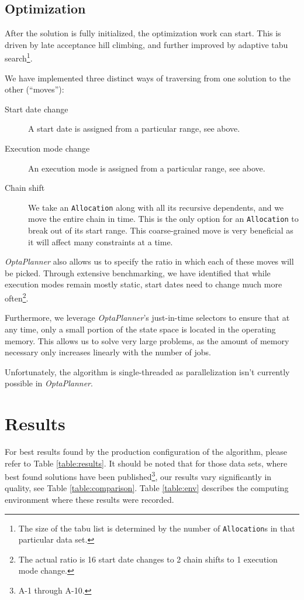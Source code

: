 \documentclass[10pt,a4paper]{article}
\begin{document}
\subsection{Optimization}

After the solution is fully initialized, the optimization work can start. This is driven by late acceptance hill climbing, and further improved by adaptive tabu search\footnote{The size of the tabu list is determined by the number of \texttt{Allocation}s in that particular data set.}.

We have implemented three distinct ways of traversing from one solution to the other (``moves''):

\begin{description}
\item[Start date change] A start date is assigned from a particular range, see above.
\item[Execution mode change] An execution mode is assigned from a particular range, see above.
\item[Chain shift] We take an \texttt{Allocation} along with all its recursive dependents, and we move the entire chain in time. This is the only option for an \texttt{Allocation} to break out of its start range. This coarse-grained move is very beneficial as it will affect many constraints at a time.
\end{description}

\textit{OptaPlanner} also allows us to specify the ratio in which each of these moves will be picked. Through extensive benchmarking, we have identified that while execution modes remain mostly static, start dates need to change much more often\footnote{The actual ratio is 16 start date changes to 2 chain shifts to 1 execution mode change.}.

Furthermore, we leverage \textit{OptaPlanner}'s just-in-time selectors to ensure that at any time, only a small portion of the state space is located in the operating memory. This allows us to solve very large problems, as the amount of memory necessary only increases linearly with the number of jobs.

Unfortunately, the algorithm is single-threaded as parallelization isn't currently possible in \textit{OptaPlanner}.

\section{Results}

For best results found by the production configuration of the algorithm, please refer to Table \ref{table:results}. It should be noted that for those data sets, where best found solutions have been published\footnote{A-1 through A-10.}, our results vary significantly in quality, see Table \ref{table:comparison}. Table \ref{table:env} describes the computing environment where these results were recorded.
\end{document}
